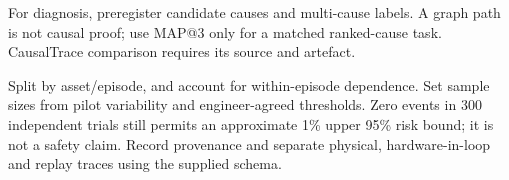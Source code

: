 For diagnosis, preregister candidate causes and multi-cause labels. A graph path
is not causal proof; use MAP@3 only for a matched ranked-cause task. CausalTrace
comparison requires its source and artefact.

Split by asset/episode, and account for within-episode dependence. Set sample
sizes from pilot variability and engineer-agreed thresholds. Zero events in 300
independent trials still permits an approximate 1\% upper 95\% risk bound; it is
not a safety claim. Record provenance and separate physical, hardware-in-loop
and replay traces using the supplied schema.